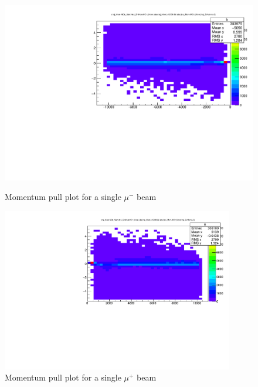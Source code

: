 \begin{figure}[h!]
	\begin{minipage}{0.49\linewidth}
		\centerline{\includegraphics[width=0.9\linewidth]{figures/mupull.pdf}}
			\caption[]{Momentum pull plot for a single $\mu^-$ beam}
		\label{fig:mommu}
	\end{minipage}
	\hfill
	\begin{minipage}{0.49\linewidth}
		\centerline{\includegraphics[width=0.9\textwidth]{figures/antimupull.pdf}}
		\caption[]{Momentum pull plot for a single $\mu^+$ beam}
		\label{fig:momantimu}
	\end{minipage}
\end{figure}

